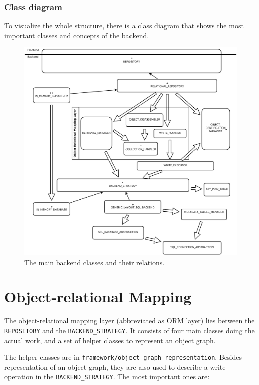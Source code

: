 \subsubsection{Class diagram}

To visualize the whole structure, there is a class diagram that shows the most important classes and concepts of the backend.

\begin{figure} [h]
\centering
\includegraphics[trim= 0mm -10mm 0mm -10mm,clip, width = 13cm] {includes/backend.png}
\caption{The main backend classes and their relations.}
\label{fig:backend_classes}
\end{figure}


\section{Object-relational Mapping}
\label{section:ORM}

The object-relational mapping layer (abbreviated as ORM layer) lies between the \lstinline!REPOSITORY! and the \lstinline!BACKEND_STRATEGY!.
It consists of four main classes doing the actual work, and a set of helper classes to represent an object graph.

The helper classes are in \lstinline!framework/object_graph_representation!.
Besides representation of an object graph, they are also used to describe a write operation in the \lstinline!BACKEND_STRATEGY!.
The most important ones are:

